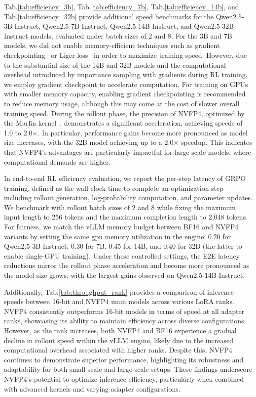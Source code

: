 Tab.\ref{tab:efficiency_3b}, Tab.\ref{tab:efficiency_7b}, Tab.\ref{tab:efficiency_14b}, and Tab.\ref{tab:efficiency_32b} provide additional speed benchmarks for the Qwen2.5-3B-Instruct, Qwen2.5-7B-Instruct, Qwen2.5-14B-Instruct, and Qwen2.5-32B-Instruct models, evaluated under batch sizes of 2 and 8. For the 3B and 7B models, we did not enable memory-efficient techniques such as gradient checkpointing~\citep{chen2016training} or Liger loss~\citep{hsu2025ligerkernel} in order to maximize training speed. However, due to the substantial size of the 14B and 32B models and the computational overhead introduced by importance sampling with gradients during RL training, we employ gradient checkpoint to accelerate computation. For training on GPUs with smaller memory capacity, enabling gradient checkpointing is recommended to reduce memory usage, although this may come at the cost of slower overall training speed. During the rollout phase, the precision of NVFP4, optimized by the Marlin kernel~\citep{frantar2024marlin}, demonstrates a significant acceleration, achieving speeds of 1.0 to 2.0$\times$. In particular, performance gains become more pronounced as model size increases, with the 32B model achieving up to a 2.0$\times$ speedup. This indicates that NVFP4's advantages are particularly impactful for large-scale models, where computational demands are higher.

In end-to-end RL efficiency evaluation, we report the per-step latency of GRPO training, defined as the wall clock time to complete an optimization step including rollout generation, log-probability computation, and parameter updates. We benchmark with rollout batch sizes of 2 and 8 while fixing the maximum input length to 256 tokens and the maximum completion length to 2,048 tokens. For fairness, we match the vLLM memory budget between BF16 and NVFP4 variants by setting the same gpu memory utilization in the engine: 0.20 for Qwen2.5-3B-Instruct, 0.30 for 7B, 0.45 for 14B, and 0.40 for 32B (the latter to enable single-GPU training). Under these controlled settings, the E2E latency reductions mirror the rollout phase acceleration and become more pronounced as the model size grows, with the largest gains observed on Qwen2.5-14B-Instruct.

Additionally, Tab.\ref{tab:throughput_rank} provides a comparison of inference speeds between 16-bit and NVFP4 main models across various LoRA ranks. NVFP4 consistently outperforms 16-bit models in terms of speed at all adapter ranks, showcasing its ability to maintain efficiency across diverse configurations. However, as the rank increases, both NVFP4 and BF16 experience a gradual decline in rollout speed within the vLLM engine, likely due to the increased computational overhead associated with higher ranks. Despite this, NVFP4 continues to demonstrate superior performance, highlighting its robustness and adaptability for both small-scale and large-scale setups. These findings underscore NVFP4's potential to optimize inference efficiency, particularly when combined with advanced kernels and varying adapter configurations.


